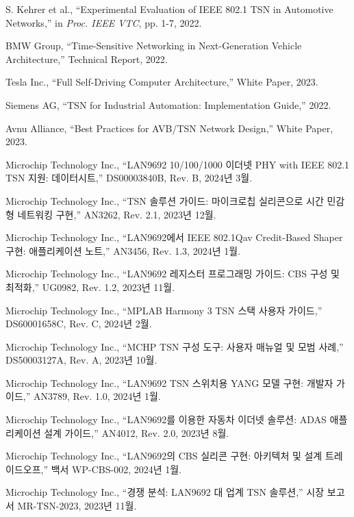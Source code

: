 \documentclass[twocolumn,10pt]{article}
\begin{document}
\begin{thebibliography}{99}
S. Kehrer et al., ``Experimental Evaluation of IEEE 802.1 TSN in Automotive Networks,'' in \textit{Proc. IEEE VTC}, pp. 1-7, 2022.

BMW Group, ``Time-Sensitive Networking in Next-Generation Vehicle Architecture,'' Technical Report, 2022.

Tesla Inc., ``Full Self-Driving Computer Architecture,'' White Paper, 2023.

Siemens AG, ``TSN for Industrial Automation: Implementation Guide,'' 2022.

Avnu Alliance, ``Best Practices for AVB/TSN Network Design,'' White Paper, 2023.

Microchip Technology Inc., ``LAN9692 10/100/1000 이더넷 PHY with IEEE 802.1 TSN 지원: 데이터시트,'' DS00003840B, Rev. B, 2024년 3월.

Microchip Technology Inc., ``TSN 솔루션 가이드: 마이크로칩 실리콘으로 시간 민감형 네트워킹 구현,'' AN3262, Rev. 2.1, 2023년 12월.

Microchip Technology Inc., ``LAN9692에서 IEEE 802.1Qav Credit-Based Shaper 구현: 애플리케이션 노트,'' AN3456, Rev. 1.3, 2024년 1월.

Microchip Technology Inc., ``LAN9692 레지스터 프로그래밍 가이드: CBS 구성 및 최적화,'' UG0982, Rev. 1.2, 2023년 11월.

Microchip Technology Inc., ``MPLAB Harmony 3 TSN 스택 사용자 가이드,'' DS60001658C, Rev. C, 2024년 2월.

Microchip Technology Inc., ``MCHP TSN 구성 도구: 사용자 매뉴얼 및 모범 사례,'' DS50003127A, Rev. A, 2023년 10월.

Microchip Technology Inc., ``LAN9692 TSN 스위치용 YANG 모델 구현: 개발자 가이드,'' AN3789, Rev. 1.0, 2024년 1월.

Microchip Technology Inc., ``LAN9692를 이용한 자동차 이더넷 솔루션: ADAS 애플리케이션 설계 가이드,'' AN4012, Rev. 2.0, 2023년 8월.

Microchip Technology Inc., ``LAN9692의 CBS 실리콘 구현: 아키텍처 및 설계 트레이드오프,'' 백서 WP-CBS-002, 2024년 1월.

Microchip Technology Inc., ``경쟁 분석: LAN9692 대 업계 TSN 솔루션,'' 시장 보고서 MR-TSN-2023, 2023년 11월.


\end{thebibliography}
\end{document}
